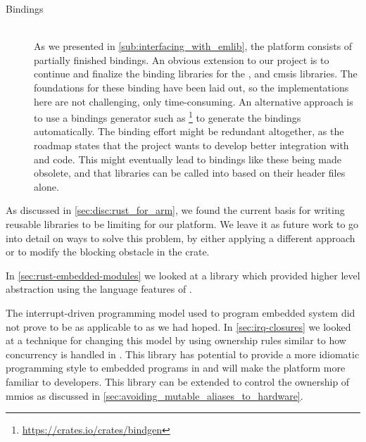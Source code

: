 \begin{description}
\item[Bindings] \hfill \\
  As we presented in \autoref{sub:interfacing_with_emlib}, the {\rg} platform consists of partially finished bindings.
  An obvious extension to our project is to continue and finalize the binding libraries for the {\emlib}, {\emdrv} and \gls{cmsis} libraries.
  The foundations for these binding have been laid out, so the implementations here are not challenging, only time-consuming.
  An alternative approach is to use a bindings generator such as \footnote{\url{https://crates.io/crates/bindgen}} to generate the bindings automatically.
  The binding effort might be redundant altogether, as the {\rust} roadmap \cite{web:roadmap} states that the project wants to develop better integration with {\C} and {\Cpp} code.
  This might eventually lead to bindings like these being made obsolete, and that {\C} libraries can be called into based on their header files alone.
\end{description}


As discussed in \autoref{sec:disc:rust_for_arm}, we found the current basis for writing reusable libraries to be limiting for our platform.
We leave it as future work to go into detail on ways to solve this problem, by either applying a different approach or to modify the blocking obstacle in the  crate.

In \autoref{sec:rust-embedded-modules} we looked at a library which provided higher level abstraction using the language features of {\rust}.

The interrupt-driven programming model used to program embedded system did not prove to be as applicable to {\rust} as we had hoped.
In \autoref{sec:irq-closures} we looked at a technique for changing this model by using ownership rules similar to how concurrency is handled in {\rust}.
This library has potential to provide a more idiomatic programming style to embedded programs in {\rust} and will make the platform more familiar to {\rust} developers.
This library can be extended to control the ownership of \glspl{mmio} as discussed in \autoref{sec:avoiding_mutable_aliases_to_hardware}.

